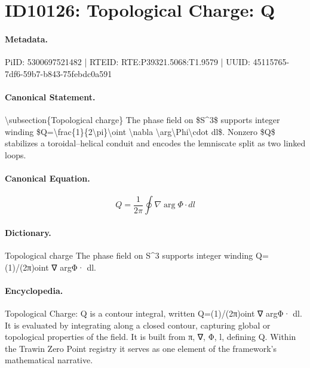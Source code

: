 \section*{ID10126: Topological Charge: Q}
\paragraph{Metadata.}
PiID: 5300697521482 | RTEID: RTE:P39321.5068:T1.9579 | UUID: 45115765-7df6-59b7-b843-75febdc0a591

\paragraph{Canonical Statement.}
\textbackslash{}subsection\{Topological charge\} The phase field on \$S\textasciicircum{}3\$ supports integer winding \$Q=\textbackslash{}frac\{1\}\{2\textbackslash{}pi\}\textbackslash{}oint \textbackslash{}nabla \textbackslash{}arg\textbackslash{}Phi\textbackslash{}cdot dl\$. Nonzero \$Q\$ stabilizes a toroidal--helical conduit and encodes the lemniscate split as two linked loops.

\paragraph{Canonical Equation.}
\[
Q=\frac{1}{2\pi}\oint \nabla \arg\Phi\cdot dl
\]

\paragraph{Dictionary.}
Topological charge The phase field on S\textasciicircum{}3 supports integer winding Q=(1)/(2π)oint ∇ argΦ· dl.

\paragraph{Encyclopedia.}
Topological Charge: Q is a contour integral, written Q=(1)/(2π)oint ∇ argΦ· dl. It is evaluated by integrating along a closed contour, capturing global or topological properties of the field. It is built from π, ∇, Φ, l, defining Q. Within the Trawin Zero Point registry it serves as one element of the framework's mathematical narrative.
